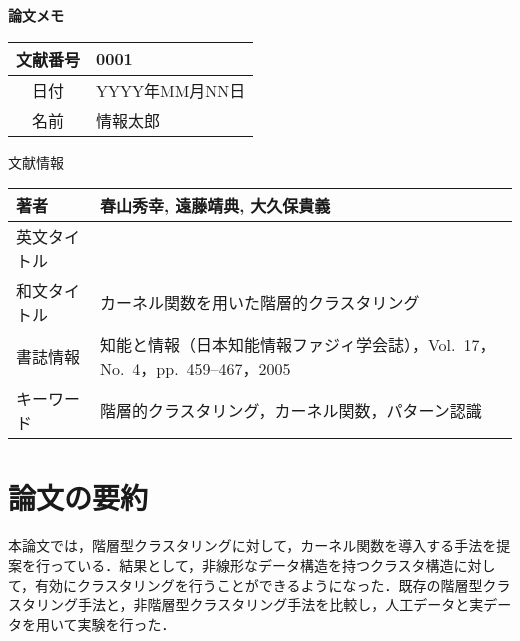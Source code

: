 \documentclass[10pt,onecolumn]{jsarticle}
\begin{document}
\vspace{-20mm}
\begin{center}
{\LARGE\textbf{論文メモ}}
\end{center}

\begin{flushright}
\begin{tabular}{|c|l|}
\hline
文献番号  &  0001
\\
\hline
日付  &  YYYY年MM月NN日
\\
\hline
名前  &  情報太郎
\\
\hline
\end{tabular}
\end{flushright}


%
%
\begin{center}
{\large 文献情報}
\begin{table}[hbp]%
\begin{tabular}{|l||l|}
\hline
著者  &  春山秀幸, 遠藤靖典, 大久保貴義
\\ \hline
英文タイトル  &
\\ \hline
和文タイトル  & カーネル関数を用いた階層的クラスタリング
\\ \hline
書誌情報  &  知能と情報（日本知能情報ファジィ学会誌），Vol.~17，No.~4，pp.~459--467，2005
\\ \hline
キーワード & 階層的クラスタリング，カーネル関数，パターン認識
\\ \hline
\end{tabular}
\end{table}
\end{center}


\section{論文の要約}
本論文では，階層型クラスタリングに対して，カーネル関数を導入する手法を提案を行っている．結果として，非線形なデータ構造を持つクラスタ構造に対して，有効にクラスタリングを行うことができるようになった．既存の階層型クラスタリング手法と，非階層型クラスタリング手法を比較し，人工データと実データを用いて実験を行った．
\end{document}
